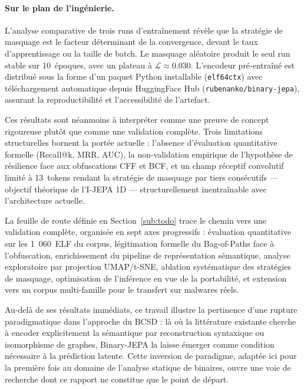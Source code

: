 \paragraph{Sur le plan de l'ingénierie.} L'analyse comparative de trois runs d'entraînement
révèle que la stratégie de masquage est le facteur déterminant de la convergence, devant
le taux d'apprentissage ou la taille de batch. Le masquage aléatoire produit le seul run
stable sur 10~époques, avec un plateau à $\mathcal{L} \approx 0.030$. L'encodeur
pré-entraîné est distribué sous la forme d'un paquet Python installable
(\texttt{elf64ctx}) avec téléchargement automatique depuis HuggingFace Hub
(\texttt{rubenanko/binary-jepa}), assurant la reproductibilité et l'accessibilité de
l'artefact.

Ces résultats sont néanmoins à interpréter comme une preuve de concept rigoureuse plutôt
que comme une validation complète. Trois limitations structurelles bornent la portée
actuelle : l'absence d'évaluation quantitative formelle (Recall@k, MRR, AUC), la
non-validation empirique de l'hypothèse de résilience face aux obfuscations CFF et BCF,
et un champ réceptif convolutif limité à 13~tokens rendant la stratégie de masquage par
tiers consécutifs — objectif théorique de l'I-JEPA 1D — structurellement inentraînable
avec l'architecture actuelle.

La feuille de route définie en Section~\ref{sub:todo} trace le chemin vers une validation
complète, organisée en sept axes progressifs : évaluation quantitative sur les 1~060~ELF
du corpus, légitimation formelle du Bag-of-Paths face à l'obfuscation, enrichissement du
pipeline de représentation sémantique, analyse exploratoire par projection UMAP/t-SNE,
ablation systématique des stratégies de masquage, optimisation de l'inférence en vue de
la portabilité, et extension vers un corpus multi-famille pour le transfert sur malwares
réels.

Au-delà de ses résultats immédiats, ce travail illustre la pertinence d'une rupture
paradigmatique dans l'approche du BCSD : là où la littérature existante cherche à encoder
explicitement la sémantique par reconstruction syntaxique ou isomorphisme de graphes,
Binary-JEPA la laisse émerger comme condition nécessaire à la prédiction latente. Cette
inversion de paradigme, adaptée ici pour la première fois au domaine de l'analyse
statique de binaires, ouvre une voie de recherche dont ce rapport ne constitue que le
point de départ.
